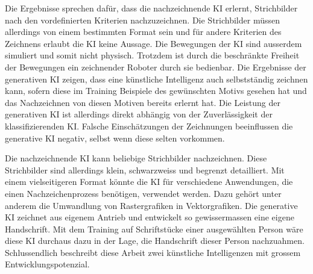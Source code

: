 Die Ergebnisse sprechen dafür, dass die nachzeichnende KI erlernt, Strichbilder
nach den vordefinierten Kriterien nachzuzeichnen. Die Strichbilder müssen
allerdings von einem bestimmten Format sein und für andere Kriterien des
Zeichnens erlaubt die KI keine Aussage. Die Bewegungen der KI sind ausserdem
simuliert und somit nicht physisch. Trotzdem ist durch die beschränkte Freiheit
der Bewegungen ein zeichnender Roboter durch sie bedienbar. Die Ergebnisse der
generativen KI zeigen, dass eine künstliche Intelligenz auch selbstständig
zeichnen kann, sofern diese im Training Beispiele des gewünschten Motivs gesehen
hat und das Nachzeichnen von diesen Motiven bereits erlernt hat. Die Leistung
der generativen KI ist allerdings direkt abhängig von der Zuverlässigkeit der
klassifizierenden KI. Falsche Einschätzungen der Zeichnungen beeinflussen die
generative KI negativ, selbst wenn diese selten vorkommen.
 
Die nachzeichnende KI kann beliebige Strichbilder nachzeichnen. Diese
Strichbilder sind allerdings klein, schwarzweiss und begrenzt detailliert.
Mit einem vielseitigeren Format könnte die KI für verschiedene Anwendungen, die
einen Nachzeichenprozess benötigen, verwendet werden. Dazu gehört unter anderem
die Umwandlung von Rastergrafiken in Vektorgrafiken. Die generative KI zeichnet
aus eigenem Antrieb und entwickelt so gewissermassen eine eigene Handschrift.
Mit dem Training auf Schriftstücke einer ausgewählten Person wäre diese KI
durchaus dazu in der Lage, die Handschrift dieser Person nachzuahmen.
Schlussendlich beschreibt diese Arbeit zwei künstliche Intelligenzen mit grossem
Entwicklungspotenzial.